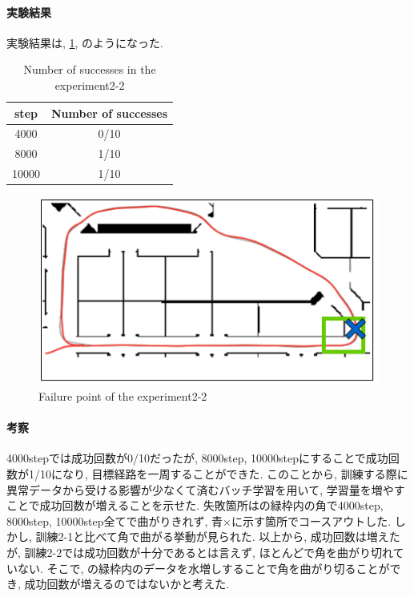 \paragraph{実験結果}
実験結果は, \ref{tb:exp3}, のようになった.

\begin{table}[h]
  \centering
  \begin{tabular}{|c|c|} \hline
    step & Number of successes \\ \hline
    4000 & 0/10 \\ \hline
    8000 & 1/10 \\ \hline
    10000 & 1/10 \\ \hline
  \end{tabular}
  \caption{Number of successes in the experiment2-2}
  \label{tb:exp3}
\end{table}

\begin{figure}[h]
  \centering
  \includegraphics[keepaspectratio, scale=0.6]{images/result3.png}
  \caption{Failure point of the experiment2-2}
  \label{Fig:result3}
  \end{figure}

\paragraph{考察}
4000stepでは成功回数が0/10だったが, 8000step, 10000stepにすることで成功回数が1/10になり, 目標経路を一周することができた. このことから, 訓練する際に異常データから受ける影響が少なくて済むバッチ学習を用いて, 学習量を増やすことで成功回数が増えることを示せた. 失敗箇所はの緑枠内の角で4000step, 8000step, 10000step全てで曲がりきれず, 青×に示す箇所でコースアウトした. しかし, 訓練2-1と比べて角で曲がる挙動が見られた. 以上から, 成功回数は増えたが, 訓練2-2では成功回数が十分であるとは言えず, ほとんどで角を曲がり切れていない. そこで, の緑枠内のデータを水増しすることで角を曲がり切ることができ, 成功回数が増えるのではないかと考えた. 

